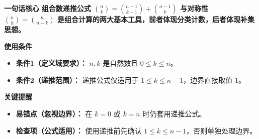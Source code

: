 \begin{summarybox}
	\textbf{\textcolor{CSummary}{一句话核心}}
	\textbf{组合数递推公式 $\binom{n}{k}=\binom{n-1}{k-1}+\binom{n-1}{k}$ 与对称性 $\binom{n}{k}=\binom{n}{n-k}$ 是组合计算的两大基本工具，前者体现分类计数，后者体现补集思想。}

	\medskip
	\textbf{\textcolor{CSummary}{使用条件}}
	\begin{itemize}[leftmargin=*, itemsep=0.5em, topsep=0.4em]
		\item \textbf{条件1（定义域要求）：} $n,k$ 是自然数且 $0\le k\le n$。
		\item \textbf{条件2（递推范围）：} 递推公式仅适用于 $1\le k\le n-1$，边界直接取值 $1$。
	\end{itemize}

	\medskip
	\textbf{\textcolor{CSummary}{关键提醒}}
	\begin{itemize}[leftmargin=*, itemsep=0.5em, topsep=0.4em]
		\item \textbf{易错点（忽视边界）：} 在 $k=0$ 或 $k=n$ 时仍套用递推公式。
		\item \textbf{检查项（公式适用）：} 使用递推前先确认 $1\le k\le n-1$，否则单独处理边界。
	\end{itemize}

\end{summarybox}

